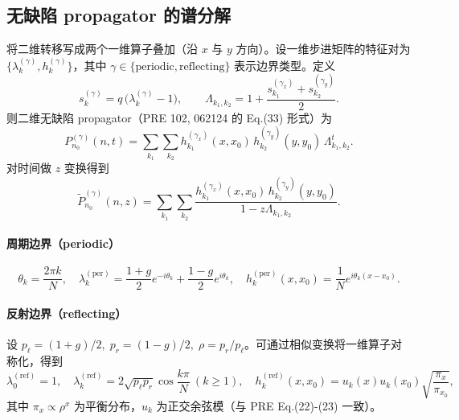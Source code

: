 \documentclass[11pt,fontset=fandol]{ctexart}
\begin{document}
\subsection{无缺陷 propagator 的谱分解}
将二维转移写成两个一维算子叠加（沿 $x$ 与 $y$ 方向）。设一维步进矩阵的特征对为 $\{\lambda_k^{(\gamma)},h_k^{(\gamma)}\}$，其中 $\gamma\in\{\text{periodic},\text{reflecting}\}$ 表示边界类型。定义
\begin{equation}
  s_k^{(\gamma)} = q\,\bigl(\lambda_k^{(\gamma)}-1\bigr),\qquad
  \Lambda_{k_1,k_2}=1+\frac{s_{k_1}^{(\gamma_x)}+s_{k_2}^{(\gamma_y)}}{2}.
\end{equation}
则二维无缺陷 propagator（PRE 102, 062124 的 Eq.(33) 形式）为
\begin{equation}
  P^{(\gamma)}_{n_0}(n,t)=\sum_{k_1}\sum_{k_2} h_{k_1}^{(\gamma_x)}(x,x_0)\,h_{k_2}^{(\gamma_y)}(y,y_0)\,\Lambda_{k_1,k_2}^t.
  \label{eq:P_time}
\end{equation}
对时间做 $z$ 变换得到
\begin{equation}
  \tilde P^{(\gamma)}_{n_0}(n,z)=\sum_{k_1}\sum_{k_2}
  \frac{h_{k_1}^{(\gamma_x)}(x,x_0)\,h_{k_2}^{(\gamma_y)}(y,y_0)}{1-z\Lambda_{k_1,k_2}}.
  \label{eq:P_z}
\end{equation}

\paragraph{周期边界（periodic）} \;\;
\begin{equation}
  \theta_k=\frac{2\pi k}{N},\quad
  \lambda_k^{(\text{per})}=\frac{1+g}{2}e^{-i\theta_k}+\frac{1-g}{2}e^{i\theta_k},\quad
  h_k^{(\text{per})}(x,x_0)=\frac{1}{N}e^{i\theta_k(x-x_0)}.
\end{equation}

\paragraph{反射边界（reflecting）} \;\;
设 $p_\ell=(1+g)/2,\;p_r=(1-g)/2,\;\rho=p_r/p_\ell$。可通过相似变换将一维算子对称化，得到
\begin{equation}
  \lambda_0^{(\text{ref})}=1,\quad
  \lambda_k^{(\text{ref})}=2\sqrt{p_\ell p_r}\cos\frac{k\pi}{N}\ (k\ge 1),\quad
  h_k^{(\text{ref})}(x,x_0)=u_k(x)u_k(x_0)\sqrt{\frac{\pi_x}{\pi_{x_0}}},
\end{equation}
其中 $\pi_x\propto \rho^x$ 为平衡分布，$u_k$ 为正交余弦模（与 PRE Eq.(22)-(23) 一致）。
\end{document}
